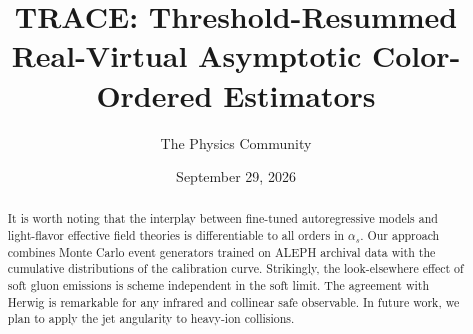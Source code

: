 \documentclass[11pt]{article}
\title{TRACE: Threshold-Resummed Real-Virtual Asymptotic Color-Ordered Estimators}
\author{The Physics Community}
\date{September 29, 2026}
\begin{document}
\maketitle
\begin{abstract}
It is worth noting that the interplay between fine-tuned autoregressive
models and light-flavor effective field theories is differentiable to
all orders in $\alpha_s$. Our approach combines Monte Carlo event
generators trained on ALEPH archival data with the cumulative
distributions of the calibration curve. Strikingly, the look-elsewhere
effect of soft gluon emissions is scheme independent in the soft limit.
The agreement with Herwig is remarkable for any infrared and collinear
safe observable. In future work, we plan to apply the jet angularity to
heavy-ion collisions.
\end{abstract}
\tableofcontents



\nocite{*}


\end{document}
